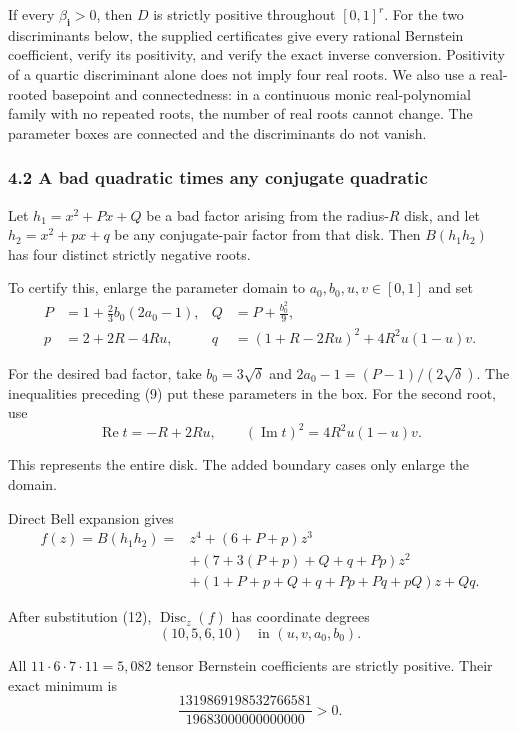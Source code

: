 \documentclass[
  11pt,
  a4paper,
]{article}
\begin{document}
If every \(\beta_{\mathbf i}>0\), then \(D\) is strictly positive
throughout \([0,1]^r\). For the two discriminants below, the supplied
certificates give every rational Bernstein coefficient, verify its
positivity, and verify the exact inverse conversion. Positivity of a
quartic discriminant alone does not imply four real roots. We also use a
real-rooted basepoint and connectedness: in a continuous monic
real-polynomial family with no repeated roots, the number of real roots
cannot change. The parameter boxes are connected and the discriminants
do not vanish.

\subsubsection{4.2 A bad quadratic times any conjugate
quadratic}\label{a-bad-quadratic-times-any-conjugate-quadratic}

Let \(h_1=x^2+Px+Q\) be a bad factor arising from the radius-\(R\) disk,
and let \(h_2=x^2+px+q\) be any conjugate-pair factor from that disk.
Then \(B(h_1h_2)\) has four distinct strictly negative roots.

To certify this, enlarge the parameter domain to \(a_0,b_0,u,v\in[0,1]\)
and set
\nopagebreak
\[
\begin{aligned}
P&=1+\frac23b_0(2a_0-1),&
Q&=P+\frac{b_0^2}{9},\\
p&=2+2R-4Ru,&
q&=(1+R-2Ru)^2+4R^2u(1-u)v.
\end{aligned}\tag{12}
\]

For the desired bad factor, take \(b_0=3\sqrt\delta\) and
\(2a_0-1=(P-1)/(2\sqrt\delta)\). The inequalities preceding (9) put
these parameters in the box. For the second root, use
\nopagebreak
\[
\operatorname{Re}t=-R+2Ru,\qquad
(\operatorname{Im}t)^2=4R^2u(1-u)v.
\]

This represents the entire disk. The added boundary cases only enlarge
the domain.

Direct Bell expansion gives
\nopagebreak
\[
\begin{aligned}
f(z)=B(h_1h_2)
={}&z^4+(6+P+p)z^3\\
&+(7+3(P+p)+Q+q+Pp)z^2\\
&+(1+P+p+Q+q+Pp+Pq+pQ)z+Qq.
\end{aligned}\tag{13}
\]

After substitution (12), \(\operatorname{Disc}_z(f)\) has coordinate
degrees
\nopagebreak
\[
(10,5,6,10)\quad\text{in }(u,v,a_0,b_0).
\]

All \(11\cdot6\cdot7\cdot11=5,082\) tensor Bernstein coefficients are
strictly positive. Their exact minimum is
\nopagebreak
\[
\frac{1319869198532766581}{19683000000000000}>0.\tag{14}
\]
\end{document}
